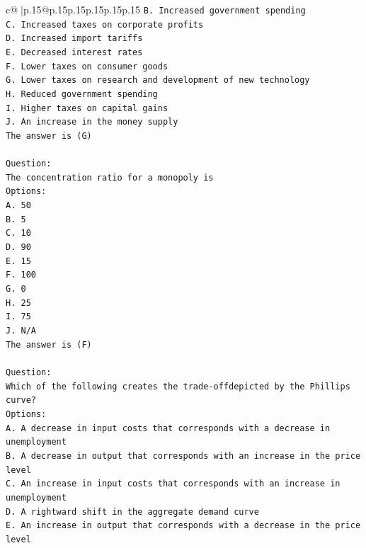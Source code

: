 \documentclass{article}
\begin{document}
{\begin{supertabular}{c@{$\;$}|p{.15\linewidth}@{}p{.15\linewidth}p{.15\linewidth}p{.15\linewidth}p{.15\linewidth}p{.15\linewidth}}
{{{\texttt{B. Increased government spending} \\
\texttt{C. Increased taxes on corporate profits} \\
\texttt{D. Increased import tariffs} \\
\texttt{E. Decreased interest rates} \\
\texttt{F. Lower taxes on consumer goods} \\
\texttt{G. Lower taxes on research and development of new technology} \\
\texttt{H. Reduced government spending} \\
\texttt{I. Higher taxes on capital gains} \\
\texttt{J. An increase in the money supply} \\
\texttt{The answer is (G)} \\
\\ 
\texttt{Question:} \\
\texttt{The concentration ratio for a monopoly is} \\
\texttt{Options:} \\
\texttt{A. 50} \\
\texttt{B. 5} \\
\texttt{C. 10} \\
\texttt{D. 90} \\
\texttt{E. 15} \\
\texttt{F. 100} \\
\texttt{G. 0} \\
\texttt{H. 25} \\
\texttt{I. 75} \\
\texttt{J. N/A} \\
\texttt{The answer is (F)} \\
\\ 
\texttt{Question:} \\
\texttt{Which of the following creates the trade{-}offdepicted by the Phillips curve?} \\
\texttt{Options:} \\
\texttt{A. A decrease in input costs that corresponds with a decrease in unemployment} \\
\texttt{B. A decrease in output that corresponds with an increase in the price level} \\
\texttt{C. An increase in input costs that corresponds with an increase in unemployment} \\
\texttt{D. A rightward shift in the aggregate demand curve} \\
\texttt{E. An increase in output that corresponds with a decrease in the price level} \\
}}}
\end{supertabular}}
\end{document}
